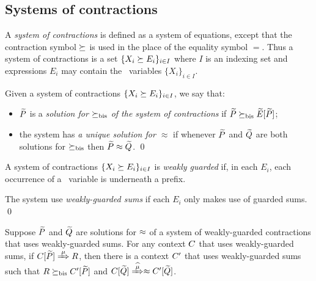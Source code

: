 \subsection{Systems of contractions}
\label{ss:SysContr}

A \emph{system of contractions} is defined as a system of equations,
except that the contraction symbol $\mathrel{\succeq}$ is used in the place of
the equality symbol $=$. Thus a system of contractions is a set 
$\{  X_i \mathrel{\succeq} E_i\}_{i\in I}$
where $I$ is an  indexing set and expressions
$E_i$  may contain the  \behavC\  variables 
$\{  X_i\}_{i\in I}$.

\begin{definition}
\label{d:uniContra}
Given a  system of contractions 
$\{  X_i \mathrel{\succeq} E_i\}_{i\in I}$, 
 we say that:
\begin{itemize}
\item
 $\widetilde P$ is a \emph{solution  for $\mathrel{\succeq_{\rm{bis}}}$ of the 
 system of contractions} 
 if $\widetilde P \mathrel{\succeq_{\rm{bis}}} \widetilde E [\widetilde P]$;
\item 
the system  
has  \emph{a unique 
solution for $\approx$}
if 
whenever 
 $\widetilde P$ and $\widetilde Q$ are both solutions  for  $\mathrel{\succeq_{\rm{bis}}}$
 then $\widetilde P \approx \widetilde Q$.
\qed\end{itemize}
\end{definition}
  


\begin{definition}
\label{d:guarded}
A system of contractions $\{  X_i \mathrel{\succeq} E_i\}_{i\in I}$
 is
\emph{weakly guarded}
if,  in each    $E_i$, each occurrence of
a \behavC\ variable is underneath a prefix.

The system use \emph{weakly-guarded sums} if 
each $E_i$ only makes use of guarded sums.
\qed\end{definition}



 
\begin{lemma}
\label{l:uptocon}
Suppose $\widetilde P$ and $\widetilde Q$ are solutions  for $\approx$
 of a system of weakly-guarded
contractions that uses  weakly-guarded sums.
For any context $C$ that uses  weakly-guarded sums, 
if  $\ct{\til P}\Arr{\mu}  R$,
 then 
there is a  context $C'$ that uses  weakly-guarded sums
such that $R \mathrel{\succeq_{\rm{bis}}} C' [\widetilde P]$ and  $\ct{\til Q} \Arcap{\mu}
 \wb \ctp{\til Q}$.
\end{lemma}

